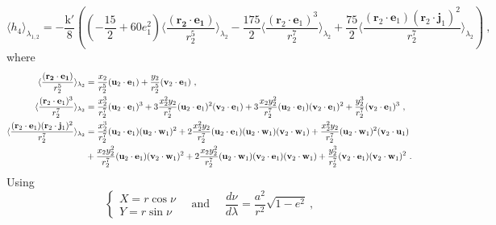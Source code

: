 \documentclass[a4paper]{article}
\begin{document}
\subsection{}
\begin{equation}
 \langle h_{4} \rangle _{\lambda_{1,2}} = -\frac{\mathrm k'}{8} \left((-\frac{15}{2}+60e_{1}^{2}) \langle \frac{(\mathbf{r_{2} \cdot e_{1}})}{r_{2}^{5}} \rangle_{\lambda_{2}}
-\frac{175}{2} \langle \frac{(\mathbf r_{2} \cdot \mathbf e_{1})^{3}}{r_{2}^{7}} \rangle_{\lambda_{2}} 
+\frac{75}{2} \langle \frac{(\mathbf r_{2} \cdot \mathbf e_{1})(\mathbf r_{2} \cdot \mathbf j_{1})^{2}}{r_{2}^{7}} \rangle_{\lambda_{2}}  \right) \ ,
\end{equation}
where
\begin{align}
\langle \frac{(\mathbf{r_{2} \cdot e_{1}})}{r_{2}^{5}} \rangle_{\lambda_{2}} &= \frac{x_{2}}{r_{2}^{5}} (\mathbf u_{2} \cdot \mathbf e_{1})+\frac{y_{2}}{r_{2}^{5}} (\mathbf v_{2} \cdot \mathbf e_{1}) \ , \\
\langle \frac{(\mathbf r_{2} \cdot \mathbf e_{1})^{3}}{r_{2}^{7}} \rangle_{\lambda_{2}} &= \frac{x_{2}^{3}}{r_{2}^{7}} (\mathbf u_{2} \cdot \mathbf e_{1})^{3}+3\frac{x_{2}^{2}y_{2}}{r_{2}^{7}} (\mathbf u_{2} \cdot \mathbf e_{1})^{2}(\mathbf v_{2} \cdot \mathbf e_{1})+3\frac{x_{2}y_{2}^{2}}{r_{2}^{7}} (\mathbf u_{2} \cdot \mathbf e_{1})(\mathbf v_{2} \cdot \mathbf e_{1})^{2}+\frac{y_{2}^{3}}{r_{2}^{7}} (\mathbf v_{2} \cdot \mathbf e_{1})^{3} \ , \\
\langle \frac{(\mathbf r_{2} \cdot \mathbf e_{1})(\mathbf r_{2} \cdot \mathbf j_{1})^{2}}{r_{2}^{7}} \rangle_{\lambda_{2}} &= \frac{x_{2}^{3}}{r_{2}^{7}} (\mathbf u_{2} \cdot \mathbf e_{1})(\mathbf u_{2} \cdot \mathbf w_{1})^{2}+2\frac{x_{2}^{2}y_{2}}{r_{2}^{7}} (\mathbf u_{2} \cdot \mathbf e_{1})(\mathbf u_{2} \cdot \mathbf w_{1})(\mathbf v_{2} \cdot \mathbf w_{1})+\frac{x_{2}^{2}y_{2}}{r_{2}^{7}} (\mathbf u_{2} \cdot \mathbf w_{1})^{2}(\mathbf v_{2} \cdot \mathbf u_{1}) \notag \\
& +\frac{x_{2}y_{2}^{2}}{r_{2}^{7}} (\mathbf u_{2} \cdot \mathbf e_{1})(\mathbf v_{2} \cdot \mathbf w_{1})^{2}+2\frac{x_{2}y_{2}^{2}}{r_{2}^{7}} (\mathbf u_{2} \cdot \mathbf w_{1})(\mathbf v_{2} \cdot \mathbf e_{1})(\mathbf v_{2} \cdot \mathbf w_{1})+\frac{y_{2}^{3}}{r_{2}^{7}} (\mathbf v_{2} \cdot \mathbf e_{1})(\mathbf v_{2} \cdot \mathbf w_{1})^{2} \ .
\end{align}
Using
\begin{equation}
\begin{cases}
X=r\cos{\nu} \\
Y=r\sin{\nu}
\end{cases}  
\quad
\text{and }
\quad
\frac{d\nu}{d\lambda}=\frac{a^{2}}{r^{2}}\sqrt{1-e^{2}} \ ,
\end{equation}
\end{document}
